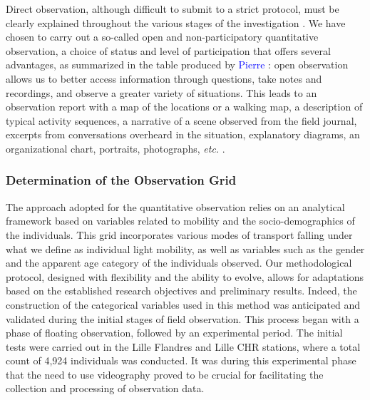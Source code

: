 \begin{refsegment}
Direct observation, although difficult to submit to a strict protocol, must be clearly explained throughout the various stages of the investigation \textcolor{blue}{\autocite[26]{arborio_observation_2007}}. We have chosen to carry out a so-called open and non-participatory quantitative observation, a choice of status and level of participation that offers several advantages, as summarized in the table produced by \textcolor{blue}{Pierre} \textcolor{blue}{\textcite[29]{fournier_observation_2010}}: open observation allows us to better access information through questions, take notes and recordings, and observe a greater variety of situations. This leads to an observation report with a map of the locations or a walking map, a description of typical activity sequences, a narrative of a scene observed from the field journal, excerpts from conversations overheard in the situation, explanatory diagrams, an organizational chart, portraits, photographs, \textsl{etc.} \textcolor{blue}{\autocite[29]{revillard_observation_2018}}.%

\subsubsection*{Determination of the Observation Grid
    \label{chap3:grille-observation-quantitative}
    }

The approach adopted for the quantitative observation relies on an analytical framework based on variables related to mobility and the socio-demographics of the individuals. This grid incorporates various modes of transport falling under what we define as individual light mobility, as well as variables such as the \gls{gender} and the apparent age category of the individuals observed. Our methodological protocol, designed with flexibility and the ability to evolve, allows for adaptations based on the established research objectives and preliminary results. Indeed, the construction of the categorical variables used in this method was anticipated and validated during the initial stages of field observation. This process began with a phase of floating observation, followed by an experimental period. The initial tests were carried out in the Lille Flandres and Lille CHR stations, where a total count of 4,924 individuals was conducted. It was during this experimental phase that the need to use videography proved to be crucial for facilitating the collection and processing of observation data.%


\end{refsegment}
